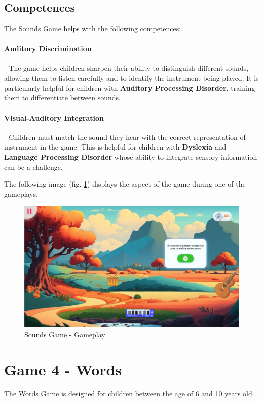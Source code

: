 \subsection*{Competences}
The Sounds Game helps with the following competences:

\paragraph{Auditory Discrimination}- The game helps children sharpen their ability to distinguish different sounds, allowing them to listen carefully and to identify the instrument being played. It is particularly helpful for children with \textbf{Auditory Processing Disorder}, training them to differentiate between sounds.

\paragraph{Visual-Auditory Integration}- Children must match the sound they hear with the correct representation of instrument in the game. This is helpful for children with \textbf{Dyslexia} and \textbf{Language Processing Disorder} whose ability to integrate sensory information can be a challenge.

The following image (fig. \ref{fig:soundsGameplay}) displays the aspect of the game during one of the gameplays.
\begin{figure}[H]
    \centering
    \includegraphics[scale=0.45]{Chapters/gameplay/SoundsGame.jpg}
    \caption{Sounds Game - Gameplay}
    \label{fig:soundsGameplay}    
\end{figure}

\newpage
\section{Game 4 - Words}
The Words Game is designed for children between the age of 6 and 10 years old.

